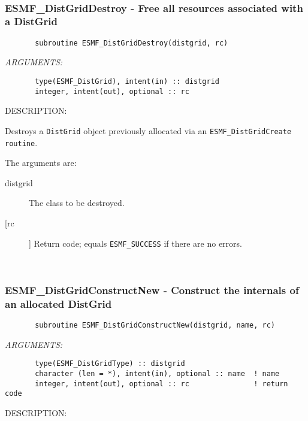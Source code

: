 \begin{verbatim} \end{verbatim}
 
 
\mbox{}\hrulefill\ 
 
\subsubsection{ESMF\_DistGridDestroy - Free all resources associated with a DistGrid }


\begin{verbatim}       subroutine ESMF_DistGridDestroy(distgrid, rc)\end{verbatim}{\em ARGUMENTS:}
\begin{verbatim}       type(ESMF_DistGrid), intent(in) :: distgrid   
       integer, intent(out), optional :: rc        \end{verbatim}
{\sf DESCRIPTION:\\ }


       Destroys a {\tt DistGrid} object previously allocated
       via an {\tt ESMF\_DistGridCreate routine}.
  
       The arguments are:
       \begin{description}
       \item[distgrid] 
            The class to be destroyed.
       \item[[rc]] 
            Return code; equals {\tt ESMF\_SUCCESS} if there are no errors.
       \end{description}
   
 
\mbox{}\hrulefill\ 
 
\subsubsection{ESMF\_DistGridConstructNew - Construct the internals of an allocated DistGrid}


 
\begin{verbatim}       subroutine ESMF_DistGridConstructNew(distgrid, name, rc)\end{verbatim}{\em ARGUMENTS:}
\begin{verbatim}       type(ESMF_DistGridType) :: distgrid 
       character (len = *), intent(in), optional :: name  ! name
       integer, intent(out), optional :: rc               ! return code\end{verbatim}
{\sf DESCRIPTION:\\ }


